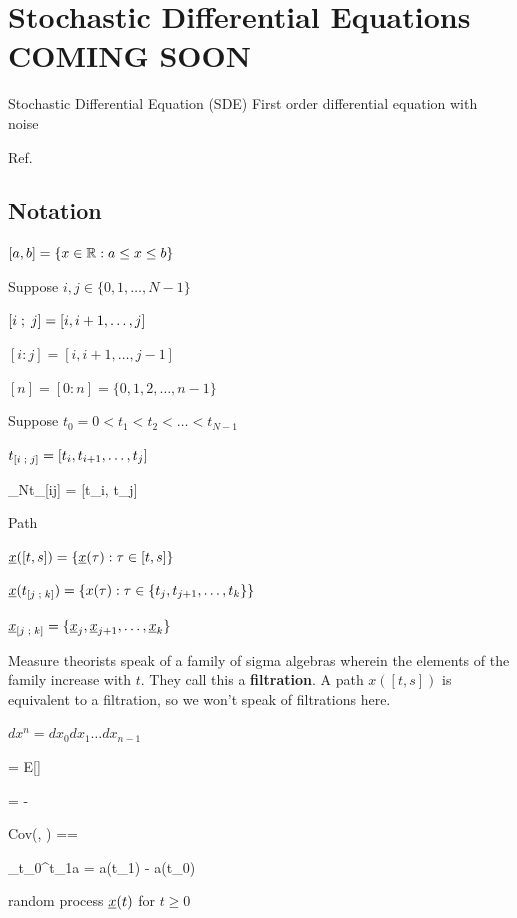 \chapter{Stochastic Differential Equations COMING SOON}
\label{ch-stochastic-diff-eqns}


Stochastic Differential Equation (SDE)
First order differential equation with noise

Ref.\cite{sde-applied-book}

\section{Notation}

$[a, b]=\{ x\in { \mathbb{R}}: a\leq x \leq b\}$

Suppose $i, j\in \{0, 1, \ldots, N-1\}$

$[i \;;\; j] = [i, i+1, \ldots, j]$

$[i:j] = [i, i+1, \ldots, j-1]$


$[n]=[0:n]=\{0, 1, 2, \ldots, n-1\}$


Suppose $t_0=0<t_1<t_2<\ldots < t_{N-1}$



$t_{[i\;;\; j]} = [t_i, t_{i+1}, \ldots, t_j]$


\beq
\lim_{N\rarrow \infty}t_{[i\upto j]} =
[t_i, t_j]
\eeq



Path

${\underline{x}}([t,s])=\{  {\underline{x}}(\tau): \tau\in[t,s]\}$


${\underline{x}}(t_{[j\;;\; k]}) =\{  x(\tau): \tau\in\{t_j, t_{j+1}, \ldots, t_k\}\}$

${\underline{x}}_{[j\;;\; k]} =\{ {\underline{x}}_j, {\underline{x}}_{j+1},
\ldots,{\underline{x}}_k\}$


Measure theorists speak of a family of sigma algebras wherein the elements of the family increase with $t$. They call this a {\bf filtration}. A path $x([t, s])$ is equivalent to a filtration,
so we won't speak of filtrations here.



$dx^n = dx_0 dx_1 \ldots dx_{n-1}$

\beq 
\av{\rva} = E[\rva]
\eeq

\beq
\Delta \rva = \rva - \av{\rva}
\eeq

\beq
Cov(\rva, \rvb) =\av{\rva, \rvb}=
\av{\Delta\rva \Delta\rvb}
\eeq

\beq
\Delta_{t_0}^{t_1}a = a(t_1) - a(t_0)
\eeq



random process ${\underline{x}}(t)$ for $t\geq 0$

